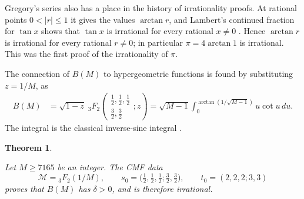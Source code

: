 \documentclass[oneside,english,11pt]{amsart}
\newtheorem{theorem}[thm]{Theorem}
\begin{document}
Gregory's series also has a place in the history of irrationality proofs. At rational points $0<|r|\le1$ it gives the values $\arctan r$, and Lambert's continued fraction for $\tan x$ shows that $\tan x$ is irrational for every rational $x\ne0$ \cite{lambert1768}. Hence $\arctan r$ is irrational for every rational $r\ne0$; in particular $\pi=4\arctan1$ is irrational. This was the first proof of the irrationality of $\pi$.

The connection of $B(M)$ to hypergeometric functions is found by substituting $z=1/M$, as
\begin{equation}\label{eq:hh-forms}
\begin{aligned}
 B(M)&=\sqrt{1-z}\;{}_3F_2\!\left(\begin{matrix}\frac12,\frac12,\frac12\\
 \frac32,\frac32\end{matrix};z\right)
 =\sqrt{M-1}\int_0^{\arctan(1/\sqrt{M-1})}u\cot u\,du.
\end{aligned}
\end{equation}
The integral is the classical inverse-sine integral \cite{lewin1981polylogarithms}.


\begin{theorem}\label{thm:hh-main}

Let $M\ge7165$ be an integer. The CMF data
\[
 \boxed{\ \mathcal M={}_3F_2(1/M),\qquad
 s_0=\bigl(\tfrac12,\tfrac12,\tfrac12;\tfrac32,\tfrac32\bigr),\qquad
 t_0=(2,2,2;3,3)\ }
\]
proves that $B(M)$ has $\delta>0$, and is therefore irrational.
\end{theorem}

\end{document}

